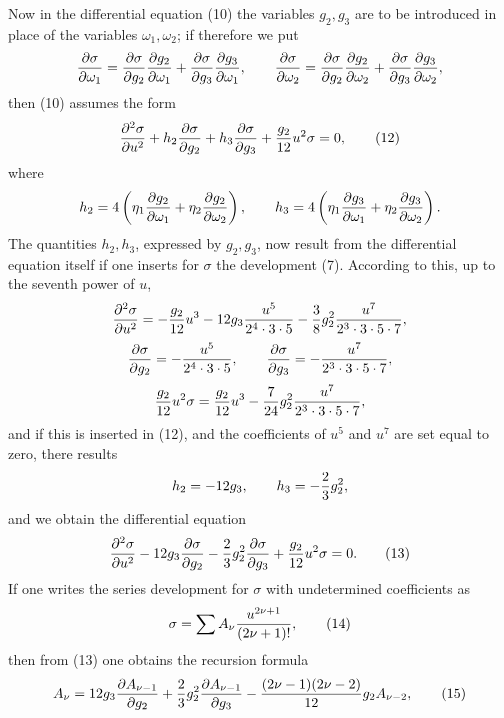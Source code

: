 \documentclass[11pt]{article}
\begin{document}
Now in the differential equation (10) the variables $g_2,g_3$ are to be introduced in place of the variables $\omega_1,\omega_2$; if therefore we put
\[
{\partial\sigma\over\partial\omega_1}={\partial\sigma\over\partial g_2}{\partial g_2\over\partial\omega_1}+{\partial\sigma\over\partial g_3}{\partial g_3\over\partial\omega_1},
\qquad
{\partial\sigma\over\partial\omega_2}={\partial\sigma\over\partial g_2}{\partial g_2\over\partial\omega_2}+{\partial\sigma\over\partial g_3}{\partial g_3\over\partial\omega_2},
\]
then (10) assumes the form
\begin{equation}
{\partial^2\sigma\over\partial u^2}
+h_2{\partial\sigma\over\partial g_2}
+h_3{\partial\sigma\over\partial g_3}
+{g_2\over12}u^2\sigma=0,
\tag{12}
\end{equation}
where
\[
h_2=4\left(\eta_1{\partial g_2\over\partial\omega_1}+\eta_2{\partial g_2\over\partial\omega_2}\right),
\qquad
h_3=4\left(\eta_1{\partial g_3\over\partial\omega_1}+\eta_2{\partial g_3\over\partial\omega_2}\right).
\]
The quantities $h_2,h_3$, expressed by $g_2,g_3$, now result from the differential equation itself if one inserts for $\sigma$ the development (7). According to this, up to the seventh power of $u$,
\[
{\partial^2\sigma\over\partial u^2}=-{g_2\over12}u^3
-12g_3{u^5\over2^4\cdot3\cdot5}
-{3\over8}g_2^2{u^7\over2^3\cdot3\cdot5\cdot7},
\]
\[
{\partial\sigma\over\partial g_2}=-{u^5\over2^4\cdot3\cdot5},
\qquad
{\partial\sigma\over\partial g_3}=-{u^7\over2^3\cdot3\cdot5\cdot7},
\]
\[
{g_2\over12}u^2\sigma={g_2\over12}u^3
-{7\over24}g_2^2{u^7\over2^3\cdot3\cdot5\cdot7},
\]
and if this is inserted in (12), and the coefficients of $u^5$ and $u^7$ are set equal to zero, there results
\[
h_2=-12g_3,
\qquad
h_3=-{2\over3}g_2^2,
\]
and we obtain the differential equation
\begin{equation}
{\partial^2\sigma\over\partial u^2}
-12g_3{\partial\sigma\over\partial g_2}
-{2\over3}g_2^2{\partial\sigma\over\partial g_3}
+{g_2\over12}u^2\sigma=0.
\tag{13}
\end{equation}
If one writes the series development for $\sigma$ with undetermined coefficients as
\begin{equation}
\sigma=\sum A_\nu{u^{2\nu+1}\over(2\nu+1)!},
\tag{14}
\end{equation}
then from (13) one obtains the recursion formula
\begin{equation}
A_\nu=12g_3{\partial A_{\nu-1}\over\partial g_2}
+{2\over3}g_2^2{\partial A_{\nu-1}\over\partial g_3}
-{(2\nu-1)(2\nu-2)\over12}g_2A_{\nu-2},
\tag{15}
\end{equation}
\end{document}
